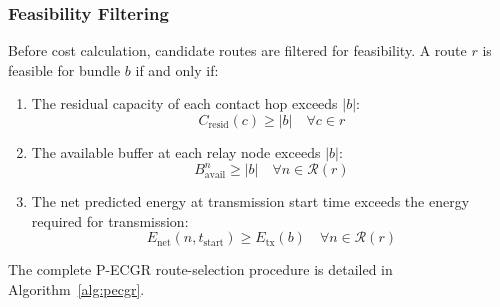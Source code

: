 \documentclass[journal,twocolumn]{IEEEtran}
\newcommand{\pecgr}{\textsf{P-ECGR}}
\begin{document}
\subsubsection{Feasibility Filtering}
Before cost calculation, candidate routes are filtered for feasibility. A route $r$ is feasible for bundle $b$ if and only if:
\begin{enumerate}
    \item The residual capacity of each contact hop exceeds $|b|$:
    \begin{equation}
        C_{\text{resid}}(c) \geq |b| \quad \forall c \in r
    \end{equation}
    \item The available buffer at each relay node exceeds $|b|$:
    \begin{equation}
        B_{\text{avail}}^n \geq |b| \quad \forall n \in \mathcal{R}(r)
    \end{equation}
    \item The net predicted energy at transmission start time exceeds the energy required for transmission:
    \begin{equation}
        E_{\text{net}}(n, t_{\text{start}}) \geq E_{\text{tx}}(b) \quad \forall n \in \mathcal{R}(r)
    \end{equation}
\end{enumerate}

The complete \pecgr{} route-selection procedure is detailed in Algorithm~\ref{alg:pecgr}.
\end{document}
